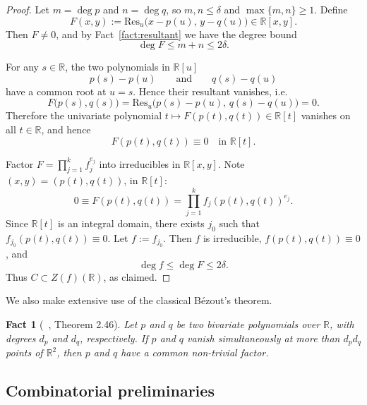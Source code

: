 \documentclass[12pt,reqno]{amsart}
\numberwithin{equation}{section}
\newtheorem{fact}{Fact}[section]
\begin{document}
\begin{proof}
Let $m=\deg p$ and $n=\deg q$, so $m,n\le \delta$ and $\max\{m,n\}\ge 1$.
Define
\[
F(x,y):=\mathrm{Res}_{u}\bigl(x-p(u),\,y-q(u)\bigr)\in\mathbb R[x,y].
\]
Then $F\neq 0$, and by Fact~\ref{fact:resultant} we have the degree bound
\[
\deg F\le m+n\le 2\delta.
\]

For any $s\in\mathbb R$, the two polynomials in $\mathbb R[u]$
\[
p(s)-p(u)\qquad\text{and}\qquad q(s)-q(u)
\]
have a common root at $u=s$. Hence their resultant vanishes, i.e.
\[
F\bigl(p(s),q(s)\bigr)
=\mathrm{Res}_{u}\bigl(p(s)-p(u),\,q(s)-q(u)\bigr)=0.
\]
Therefore the univariate polynomial $t\mapsto F(p(t),q(t))\in\mathbb R[t]$
vanishes on all $t\in\mathbb R$, and hence
\[
F(p(t),q(t))\equiv 0 \quad \text{in }\mathbb R[t].
\]

Factor $F=\prod_{j=1}^k f_j^{e_j}$ into irreducibles in $\mathbb R[x,y]$.
Note $(x,y)=(p(t),q(t))$, in $\mathbb R[t]$:
\[
0\equiv F(p(t),q(t))=\prod_{j=1}^k f_j(p(t),q(t))^{e_j}.
\]
Since $\mathbb R[t]$ is an integral domain, there exists $j_0$ such that
$f_{j_0}(p(t),q(t))\equiv 0$. Let $f:=f_{j_0}$. Then $f$ is irreducible,
$f(p(t),q(t))\equiv 0$, and
\[
\deg f\le \deg F\le 2\delta.
\]
Thus $C\subset Z(f)(\mathbb R)$, as claimed.
\end{proof}







We also make extensive use of the classical B\'{e}zout's theorem.














\begin{fact}[~\cite{sendra2008rational}, Theorem 2.46]\label{fact:bezout}
	 Let $p$ and $q$ be two bivariate polynomials over $\mathbb{R}$, with degrees $d_p$ and $d_q$, respectively. If $p$ and $q$ vanish simultaneously at more than $d_p d_q$ points of $\mathbb{R}^2$, then $p$ and $q$ have a common non-trivial factor.
\end{fact}


\subsection{Combinatorial preliminaries}
\end{document}
